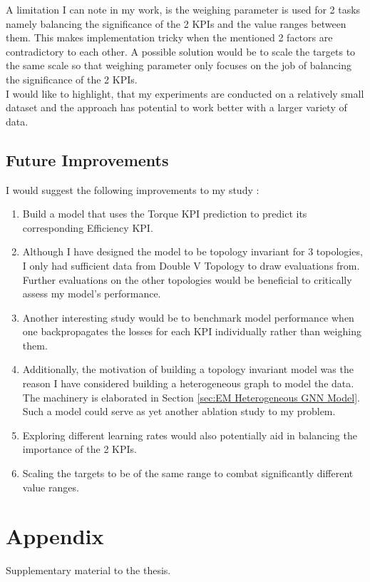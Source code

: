 \documentclass{report} %
\begin{document}
A limitation I can note in my work, is the weighing parameter is used for 2 tasks namely balancing the significance of the 2 \ac{KPI}s and the value ranges between them. 
This makes implementation tricky when the mentioned 2 factors are contradictory to each other. A possible solution would be to scale the targets to the same scale so 
that weighing parameter only focuses on the job of balancing the significance of the 2 \ac{KPI}s.\\
I would like to highlight, that my experiments are conducted on a relatively small dataset and the approach has potential to work better with a larger variety of data.

\section{Future Improvements}\label{sec:Future Improvements}
I would suggest the following improvements to my study : 

\begin{enumerate}[nosep]
    \item Build a model that uses the Torque \ac{KPI} prediction to predict its corresponding Efficiency \ac{KPI}. 
    \item Although I have designed the model to be topology invariant for 3 topologies, I only had sufficient data from Double V Topology to draw evaluations from.
    Further evaluations on the other topologies would be beneficial to critically assess my model's performance.
    \item Another interesting study would be to benchmark model performance when one backpropagates the losses for each \ac{KPI} individually rather than weighing them.
    \item Additionally, the motivation of building a topology invariant model was the reason I have considered building a heterogeneous graph to model the data. The machinery is elaborated in Section \ref{sec:EM Heterogeneous GNN Model}.
    Such a model could serve as yet another ablation study to my problem.
    \item Exploring different learning rates would also potentially aid in balancing the importance of the 2 \ac{KPI}s.
    \item Scaling the targets to be of the same range to combat significantly different value ranges.
\end{enumerate}

\appendix
\chapter{Appendix}
Supplementary material to the thesis.
\end{document}
